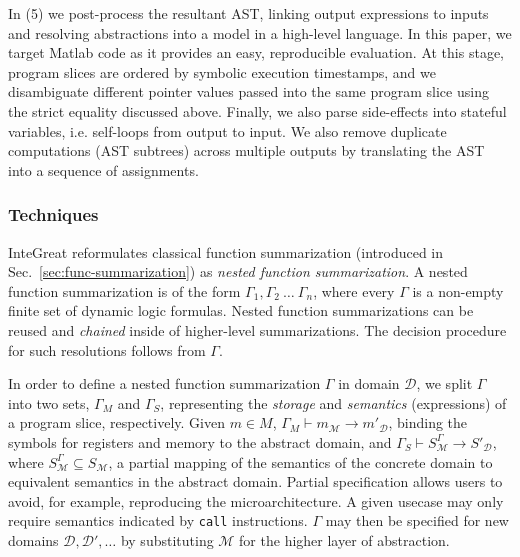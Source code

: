 In (5) we post-process the resultant AST, linking output expressions to inputs and resolving abstractions into a model in a high-level language. 
In this paper, we target Matlab code as it provides an easy, reproducible evaluation.
At this stage, program slices are ordered by symbolic execution timestamps, and we disambiguate different pointer values passed into the same program slice using the strict equality discussed above.
Finally, we also parse side-effects into stateful variables, i.e. self-loops from output to input.
We also remove duplicate computations (AST subtrees) across multiple outputs by translating the AST into a sequence of assignments.

\subsubsection{Techniques}

InteGreat reformulates classical function summarization (introduced in Sec.~\ref{sec:func-summarization}) as \emph{nested function summarization}.
A nested function summarization is of the form $\Gamma_1, \Gamma_2 \ \ldots \ \Gamma_n$, where every $\Gamma$ is a non-empty finite set of dynamic logic formulas. 
Nested function summarizations can be reused and \emph{chained} inside of higher-level summarizations.
The decision procedure for such resolutions follows from $\Gamma$.

In order to define a nested function summarization $\Gamma$ in domain $\mathcal{D}$, we split $\Gamma$ into two sets, $\Gamma_{M}$ and $\Gamma_{S}$, representing the \emph{storage} and \emph{semantics} (expressions) of a program slice, respectively.
Given $m \in M$, $\Gamma_{M} \vdash m_{\mathcal{M}} \rightarrow m'_{\mathcal{D}}$, binding the symbols for registers and memory to the abstract domain, and $\Gamma_{S} \vdash S^{\Gamma}_{\mathcal{M}} \rightarrow S'_{\mathcal{D}}$, where $S^{\Gamma}_{\mathcal{M}} \subseteq S_{\mathcal{M}}$, a partial mapping of the semantics of the concrete domain to equivalent semantics in the abstract domain.
Partial specification allows users to avoid, for example, reproducing the microarchitecture. A given usecase may only require semantics indicated by \texttt{call} instructions.
$\Gamma$ may then be specified for new domains $\mathcal{D}, \mathcal{D}', \ldots$ by substituting $\mathcal{M}$ for the higher layer of abstraction.

